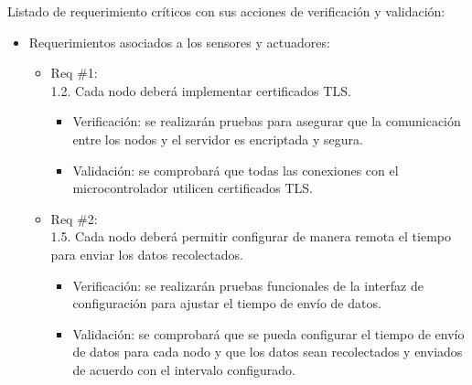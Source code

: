 Listado de requerimiento críticos con sus acciones de verificación y
validación:

\begin{itemize}
	\item Requerimientos asociados a los sensores y actuadores:
	      \begin{itemize}
		      \item Req \#1:\\ 1.2. Cada nodo deberá implementar certificados TLS.
		            \begin{itemize}
			            \item Verificación: se realizarán pruebas para asegurar que la comunicación entre los
			                  nodos y el servidor es encriptada y segura.
			            \item Validación: se comprobará que todas las conexiones con el microcontrolador
			                  utilicen certificados TLS.
		            \end{itemize}
		      \item Req \#2: \\ 1.5. Cada nodo deberá permitir configurar de manera remota el
		            tiempo para enviar los datos recolectados.
		            \begin{itemize}
			            \item Verificación: se realizarán pruebas funcionales de la interfaz de configuración
			                  para ajustar el tiempo de envío de datos.
			            \item Validación: se comprobará que se pueda configurar el tiempo de envío de datos
			                  para cada nodo y que los datos sean recolectados y enviados de acuerdo con el
			                  intervalo configurado.


\end{itemize}
\end{itemize}
\end{itemize}
